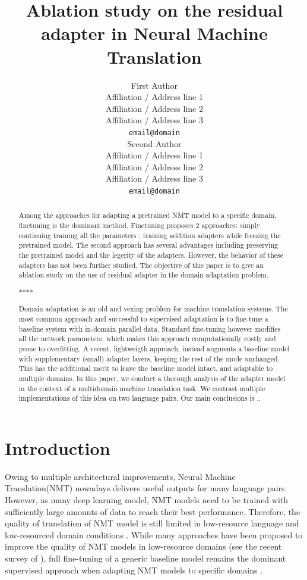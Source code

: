 \documentclass[11pt,a4paper]{article}
\title{Ablation study on the residual adapter in Neural Machine Translation}
\author{First Author \\
  Affiliation / Address line 1 \\
  Affiliation / Address line 2 \\
  Affiliation / Address line 3 \\
  \texttt{email@domain} \\\And
  Second Author \\
  Affiliation / Address line 1 \\
  Affiliation / Address line 2 \\
  Affiliation / Address line 3 \\
  \texttt{email@domain} \\}
\date{}
\newcommand{\fyTodo}[1]{\Todo[FY:]{\textcolor{orange}{#1}}}
\newcommand{\mpTodo}[1]{\Todo[MP:]{\textcolor{green}{#1}}}
\begin{document}
\maketitle
\begin{abstract}
Among the approaches for adapting a pretrained NMT model to a specific domain, finetuning is the dominant method. Finetuning proposes 2 approaches: simply continuing training all the parameters \cite{Luong15stanford}; training addition adapters while freezing the pretrained model\cite{Bapna19simple, Vilar18learning}. The second approach has several advantages including preserving the pretrained model and the legerity of the adapters. However, the behavior of these adapters has not been further studied. The objective of this paper is to give an ablation study on the use of residual adapter in the domain adaptation problem.
\mpTodo{correcting abstract}

**** 

\fyTodo{Citation-free abstract}
Domain adaptation is an old and vexing problem for machine translation systems. The most common approach and successful to supervised adaptation is to fine-tune a baseline system with in-domain parallel data. Standard fine-tuning however modifies all the network parameters, which makes this approach computationally costly and prone to overfitting. A recent, lightweigth approach, instead augments a baseline model with supplementary (small) adapter layers, keeping the rest of the mode unchanged. This has the additional merit to leave the baseline model intact, and adaptable to multiple domains. In this paper, we conduct a thorough analysis of the adapter model in the context of a multidomain machine translation task. We contrast multiple implementations of this idea on two language pairs. Our main conclusions is ..\fyTodo{abstract to be continued}

\end{abstract}
\section{Introduction } \label{sec:intro}
\mpTodo{write introduction} \fyTodo{Citations in chronological order}\fyTodo{Split long sentences}
Owing to multiple architectural improvements, Neural Machine Translation(NMT) \cite{Kalchbrenner13recurrent,Sutskever14sequence,Bahdanau15learning,Vaswani17attention} nowadays delivers useful outputs for many language pairs. However, as many deep learning model, NMT models need to be trained with sufficiently large amounts of data to reach their best performance. Therefore, the quality of translation of NMT model is still limited in low-resource language and low-resourced domain conditions \cite{duh13adaptation, zoph16transfer,koehn17six}. While many approaches have been proposed to improve the quality of NMT models in low-resource domains (see the recent survey of \citet{Chu18asurvey}), full fine-tuning of a generic baseline model remains the dominant supervised approach when adapting NMT models to specific domains \cite{Luong15stanford,neubig18rapid}.
\end{document}

